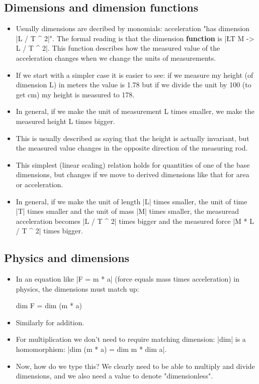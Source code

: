 \documentclass{article}
\begin{document}
\subsection{Dimensions and dimension functions}
\label{sec:org5f28f0f}
\begin{itemize}
\item Usually dimensions are decribed by monomials: acceleration "has
dimension |L / T ^ 2|". The formal reading is that the dimension
\textbf{function} is |\L T M -> L / T ^ 2|. This function describes how the
measured value of the acceleration changes when we change the units
of measurements.
\item If we start with a simpler case it is easier to see: if we measure
my height (of dimension L) in meters the value is 1.78 but if we
divide the unit by 100 (to get cm) my height is measured to 178.
\item In general, if we make the unit of measurement L times smaller, we
make the measured height L times bigger.
\item This is usually described as saying that the height is actually
invariant, but the measured value changes in the opposite direction
of the measuring rod.
\item This simplest (linear scaling) relation holds for quantities of one
of the base dimensions, but changes if we move to derived dimensions
like that for area or acceleration.
\item In general, if we make the unit of length |L| times smaller, the
unit of time |T| times smaller and the unit of mass |M| times
smaller, the measuread acceleration becomes |L / T ^ 2| times bigger and
the measured force |M * L / T ^ 2| times bigger.
\end{itemize}
\subsection{Physics and dimensions}
\label{sec:orgfce6857}
\begin{itemize}
\item In an equation like |F = m * a| (force equals mass times
acceleration) in physics, the dimensions must match up:
\begin{spec}
dim F = dim (m * a)
\end{spec}
\item Similarly for addition.
\item For multiplication we don't need to require matching
dimension: |dim| is a homomorphism: |dim (m * a) = dim m * dim a|.
\item Now, how do we type this? We clearly need to be able to multiply and
divide dimensions, and we also need a value to denote
"dimensionless".
\end{itemize}
\end{document}
